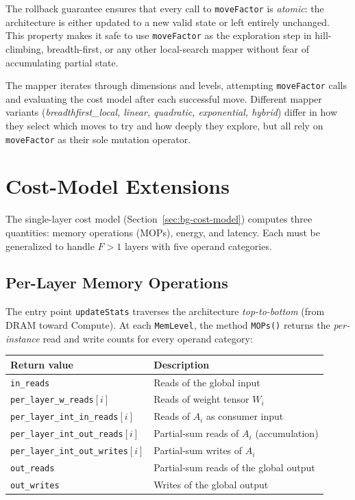 \noindent
The rollback guarantee ensures that every call to \texttt{moveFactor}
is \emph{atomic}: the architecture is either updated to a new valid
state or left entirely unchanged.
This property makes it safe to use \texttt{moveFactor} as the
exploration step in hill-climbing, breadth-first, or any other
local-search mapper without fear of accumulating partial state.

The mapper iterates through dimensions and levels, attempting
\texttt{moveFactor} calls and evaluating the cost model after each
successful move.
Different mapper variants
(\textit{breadthfirst\_local, linear, quadratic,
exponential, hybrid}) differ in how they select
which moves to try and how deeply they explore, but all rely on
\texttt{moveFactor} as their sole mutation operator.


\section{Cost-Model Extensions}
\label{sec:ps-cost-model}

The single-layer cost model (Section~\ref{sec:bg-cost-model}) computes
three quantities: memory operations (MOPs), energy, and latency.
Each must be generalized to handle $F > 1$ layers with five operand
categories.

\subsection{Per-Layer Memory Operations}
\label{sec:ps-mops}

The entry point \texttt{updateStats} traverses the architecture
\emph{top-to-bottom} (from DRAM toward Compute).
At each \texttt{MemLevel}, the method \texttt{MOPs()} returns the
\emph{per-instance} read and write counts for every operand category:

\begin{center}
\small
\begin{tabular}{ll}
  \toprule
  \textbf{Return value} & \textbf{Description} \\
  \midrule
  \texttt{in\_reads}
      & Reads of the global input \\
  \texttt{per\_layer\_w\_reads}$[i]$
      & Reads of weight tensor $W_i$ \\
  \texttt{per\_layer\_int\_in\_reads}$[i]$
      & Reads of $A_i$ as consumer input \\
  \texttt{per\_layer\_int\_out\_reads}$[i]$
      & Partial-sum reads of $A_i$ (accumulation) \\
  \texttt{per\_layer\_int\_out\_writes}$[i]$
      & Partial-sum writes of $A_i$ \\
  \texttt{out\_reads}
      & Partial-sum reads of the global output \\
  \texttt{out\_writes}
      & Writes of the global output \\
  \bottomrule
\end{tabular}
\end{center}

